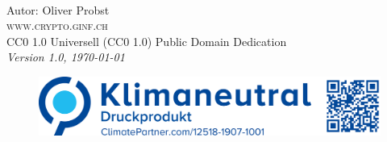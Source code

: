 \newpage
~\vfill
\thispagestyle{empty}

\noindent Autor: Oliver Probst\\

\noindent \textsc{www.crypto.ginf.ch}\\

\noindent \ccLogo \hspace{0.1cm} \ccZero \hspace{0.1cm} CC0 1.0 Universell (CC0 1.0) Public Domain Dedication \\

\noindent \textit{Version 1.0, \today}

\begin{figure}[htb]
\includegraphics[scale=0.15]{climate}
\end{figure}
